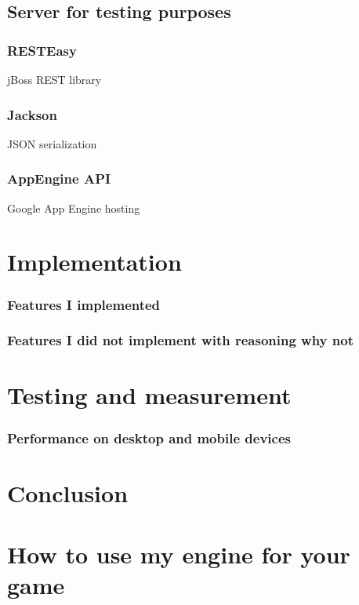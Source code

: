 \documentclass[11pt,oneside, final]{fithesis2}
\begin{document}
\section{Server for testing purposes}
\subsection{RESTEasy}
jBoss REST library

\subsection{Jackson}
JSON serialization

\subsection{AppEngine API}
Google App Engine hosting

\chapter{Implementation}
\subsection{Features I implemented}
\subsection{Features I did not implement with reasoning why not}

\chapter{Testing and measurement}
\subsection{Performance on desktop and mobile devices}

\chapter{Conclusion}


\appendix
\chapter{How to use my engine for your game}
\end{document}
